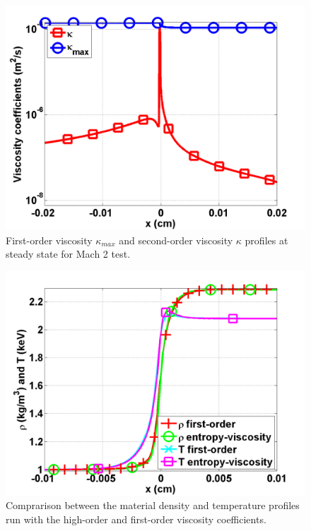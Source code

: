 \begin{figure}[H]
                \centering
                \includegraphics[width=\textwidth]{figures/Mach_2_nel_2000_viscosity.png}
        \caption{First-order viscosity $\kappa_{max}$ and second-order viscosity $\kappa$ profiles at steady state for Mach 2 test.}\label{fig:Mach2_viscosity}
\end{figure}
\begin{figure}[H]
                \centering
                \includegraphics[width=\textwidth]{figures/Mach_2_fo_ev.png}
        \caption{Comprarison between the material density and temperature profiles run with the high-order and first-order viscosity coefficients.}\label{fig:Mach2_tempEVandFO}
\end{figure}

